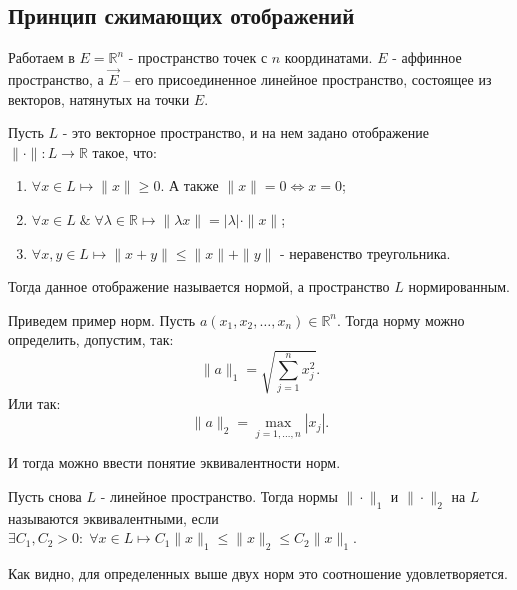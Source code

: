 \subsection*{Принцип сжимающих отображений}

Работаем в $E =\mathbb{R}^n$ - пространство точек с $n$ координатами. $E$ - аффинное пространство, а $\vec{E}$ -- его присоединенное линейное пространство, состоящее из векторов, натянутых на точки $E$.

\begin{definition}
	Пусть $L$ - это векторное пространство, и на нем задано отображение $\|\cdot\|:L\longrightarrow \mathbb{R}$ такое, что:
	\begin{enumerate}
		\item $\forall x \in L \longmapsto \|x\| \geqslant 0$. А также $\|x\| = 0 \Longleftrightarrow x = 0$;
		
		\item $\forall x \in L \; \& \; \forall \lambda \in \mathbb{R} \longmapsto \|\lambda x\| = |\lambda| \cdot \|x\|$;
		
		\item $\forall x, y \in L \longmapsto \|x+y\| \leqslant \|x\| + \|y\|$ - неравенство треугольника.
	\end{enumerate}
	Тогда данное отображение называется нормой, а пространство $L$ нормированным.
\end{definition}

\begin{example}
	Приведем пример норм. Пусть $a(x_1, x_2, \dots, x_n) \in \mathbb{R}^n$. Тогда норму можно определить, допустим, так:
	\begin{equation*}
		\|a\|_1 = \sqrt{\sum_{j = 1}^{n} x_j^2}.
	\end{equation*}
Или так:
	\begin{equation*}
		\|a\|_2 = \max_{j = 1, \dots, n}|x_j|.
	\end{equation*}
\end{example}

И тогда можно ввести понятие эквивалентности норм.

\begin{definition}
	Пусть снова $L$ - линейное пространство. Тогда нормы $\| \cdot \|_1$ и $\| \cdot \|_2$ на $L$ называются эквивалентными, если $\exists C_1, C_2 > 0: \; \forall x \in L \longmapsto C_1\|x\|_1 \leqslant \|x\|_2 \leqslant C_2\|x\|_1$.
\end{definition}

Как видно, для определенных выше двух норм это соотношение удовлетворяется.

